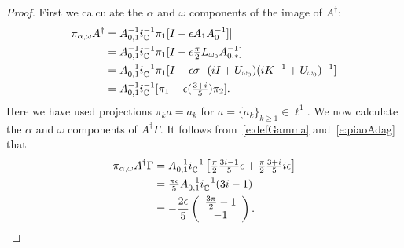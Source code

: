 \begin{proof}
	First we calculate the $ \alpha$ and $ \omega$ components of the image of $ A^\dagger $:	
	\begin{alignat}{1}
	\pi_{\alpha,\omega} A^\dagger  &= A_{0,1}^{-1} i_{\mathbb{C}}^{-1} \pi_1 [ I - \epsilon A_1 A_0^{-1}] ] \nonumber \\
	&=   A_{0,1}^{-1} i_{\mathbb{C}}^{-1} \pi_1 [ I - \epsilon \tfrac{\pi}{2} L_{\omega_0}  A_{0,*}^{-1}] \nonumber \\
	&=   A_{0,1}^{-1} i_{\mathbb{C}}^{-1} \pi_1 [ I - \epsilon \sigma^{-} ( iI + U_{\omega_0} ) ( i K^{-1} + U_{\omega_0})^{-1}] \nonumber \\ 
	&=  A_{0,1}^{-1} i_{\mathbb{C}}^{-1} [ \pi_1- \epsilon ( \tfrac{3 +i}{5}) \pi_2 ].
	\label{e:piaoAdag}
	\end{alignat}
Here we have used projections $\pi_k a = a_k$ for $a=\{a_k\}_{k \geq 1} \in \ell^1$.
	We now calculate the $\alpha $ and $\omega$ components of $ A^\dagger \Gamma$. 
	It follows from~\eqref{e:defGamma} and~\eqref{e:piaoAdag} that
	\begin{alignat*}{1}
	\pi_{\alpha,\omega} A^\dagger \Gamma  
	&= A_{0,1}^{-1} i_{\mathbb{C}}^{-1} \left[ \tfrac{\pi}{2} \tfrac{3i -1}{5} \epsilon +  \tfrac{\pi}{2}  \tfrac{3 +i}{5}  i \epsilon \right]
	\\
	&= \tfrac{\pi \epsilon}{5} A_{0,1}^{-1} i_{\mathbb{C}}^{-1} ( 3 i -1) 
	 \\
	&= - \frac{2 \epsilon}{5}
	\left(
	\begin{array}{c}
	\tfrac{3\pi}{2}-1 \\
	-1
	\end{array}
	\right) .
	\end{alignat*}
	

\end{proof}
